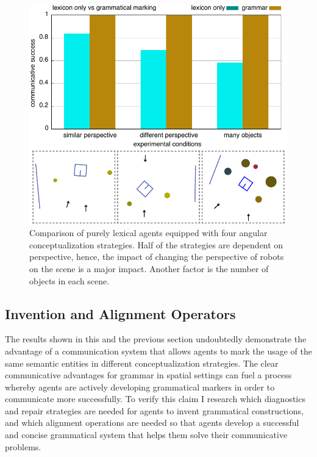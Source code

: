 \begin{figure}
\includegraphics[width=1.0\columnwidth]{figs/why-grammar}
\caption[Comparison lexical versus grammatical agents]{
Comparison of purely lexical agents equipped with four angular 
conceptualization strategies. Half of the strategies are dependent on 
perspective, hence, the impact of changing the perspective of robots on the scene
is a major impact. Another factor is the number of objects in each scene.}
\label{f:why-grammar}
\end{figure}

\subsection{Invention and Alignment Operators}
The results shown in this and the previous section undoubtedly demonstrate
the advantage of a communication system that allows agents to mark the usage 
of the same semantic entities in different conceptualization strategies. The clear 
communicative advantages for grammar in spatial settings can fuel a process whereby 
agents are actively developing grammatical markers in order to communicate more 
successfully. To verify this claim I research which diagnostics and repair 
strategies are needed for agents to invent grammatical constructions, and which 
alignment operations are needed so that agents develop a successful and concise 
grammatical system that helps them solve their communicative problems.

